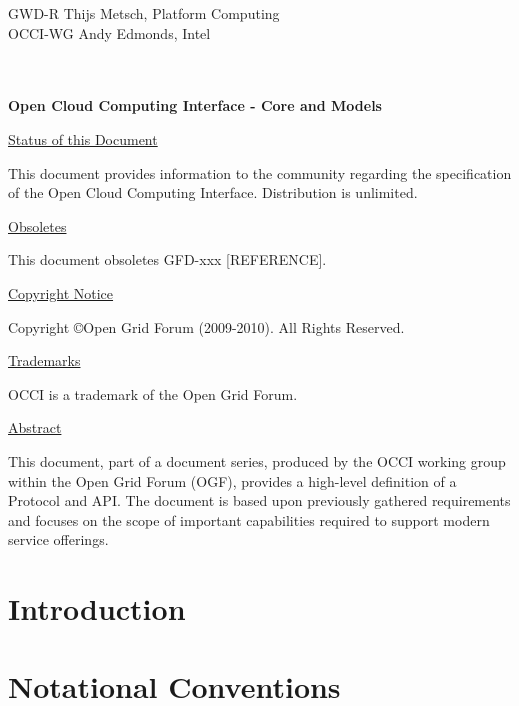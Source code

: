 \documentclass[10pt,a4paper,british]{article}
\begin{document}
\thispagestyle{empty}

GWD-R \hfill  Thijs Metsch, Platform Computing\\
OCCI-WG \hfill  Andy Edmonds, Intel\\
\\
\\

\vspace*{0.5in}

\begin{Large}
\textbf{Open Cloud Computing Interface - Core and Models}
\end{Large}

\vspace*{0.5in}

\underline{Status of this Document}

This document provides information to the community regarding the
specification of the Open Cloud Computing Interface. Distribution is
unlimited.

\underline{Obsoletes}

This document obsoletes GFD-xxx [REFERENCE].

\underline{Copyright Notice}

Copyright \copyright Open Grid Forum (2009-2010). All Rights Reserved.

\underline{Trademarks}

OCCI is a trademark of the Open Grid Forum.

\underline{Abstract}

This document, part of a document series, produced by the OCCI working
group within the Open Grid Forum (OGF), provides a high-level
definition of a Protocol and API. The document is based upon
previously gathered requirements and focuses on the scope of important
capabilities required to support modern service offerings.

\newpage
\tableofcontents
\newpage

\section{Introduction}


\section{Notational Conventions}

\end{document}
